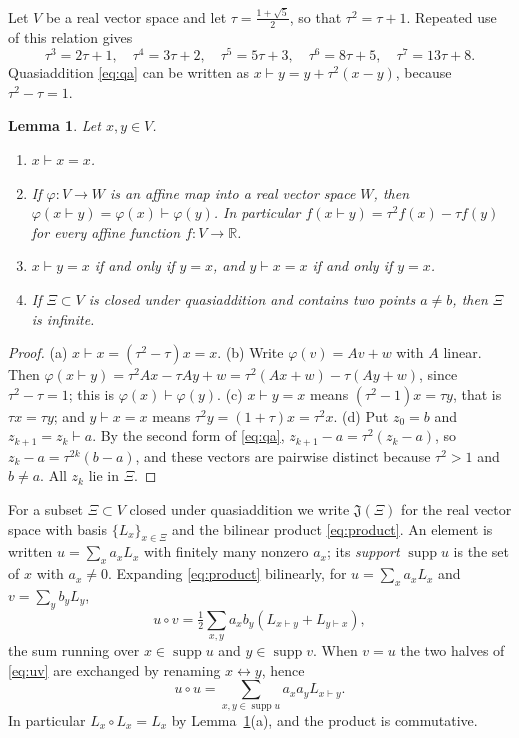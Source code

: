 \documentclass[11pt]{amsart}
\newtheorem{lemma}[theorem]{Lemma}
\theoremstyle{definition}
\theoremstyle{remark}
\newcommand{\R}{\mathbb{R}}
\newcommand{\J}{\mathfrak{J}}
\newcommand{\qa}{\vdash}
\newcommand{\supp}{\operatorname{supp}}
\begin{document}
Let $V$ be a real vector space and let $\tau=\frac{1+\sqrt5}{2}$, so that $\tau^2=\tau+1$. Repeated use of this relation gives
\begin{equation}\label{eq:powers}
\tau^3=2\tau+1,\quad \tau^4=3\tau+2,\quad \tau^5=5\tau+3,\quad \tau^6=8\tau+5,\quad \tau^7=13\tau+8 .
\end{equation}
Quasiaddition \eqref{eq:qa} can be written as $x\qa y=y+\tau^2(x-y)$, because $\tau^2-\tau=1$.

\begin{lemma}\label{lem:qa}
Let $x,y\in V$.
\begin{enumerate}
\item[(a)] $x\qa x=x$.
\item[(b)] If $\varphi\colon V\to W$ is an affine map into a real vector space $W$, then $\varphi(x\qa y)=\varphi(x)\qa\varphi(y)$. In particular $f(x\qa y)=\tau^2f(x)-\tau f(y)$ for every affine function $f\colon V\to\R$.
\item[(c)] $x\qa y=x$ if and only if $y=x$, and $y\qa x=x$ if and only if $y=x$.
\item[(d)] If $\Xi\subset V$ is closed under quasiaddition and contains two points $a\neq b$, then $\Xi$ is infinite.
\end{enumerate}
\end{lemma}

\begin{proof}
(a) $x\qa x=(\tau^2-\tau)x=x$. (b) Write $\varphi(v)=Av+w$ with $A$ linear. Then $\varphi(x\qa y)=\tau^2Ax-\tau Ay+w=\tau^2(Ax+w)-\tau(Ay+w)$, since $\tau^2-\tau=1$; this is $\varphi(x)\qa\varphi(y)$. (c) $x\qa y=x$ means $(\tau^2-1)x=\tau y$, that is $\tau x=\tau y$; and $y\qa x=x$ means $\tau^2y=(1+\tau)x=\tau^2x$. (d) Put $z_0=b$ and $z_{k+1}=z_k\qa a$. By the second form of \eqref{eq:qa}, $z_{k+1}-a=\tau^2(z_k-a)$, so $z_k-a=\tau^{2k}(b-a)$, and these vectors are pairwise distinct because $\tau^2>1$ and $b\ne a$. All $z_k$ lie in $\Xi$.
\end{proof}

For a subset $\Xi\subset V$ closed under quasiaddition we write $\J(\Xi)$ for the real vector space with basis $\{L_x\}_{x\in\Xi}$ and the bilinear product \eqref{eq:product}. An element is written $u=\sum_xa_xL_x$ with finitely many nonzero $a_x$; its \emph{support} $\supp u$ is the set of $x$ with $a_x\ne0$. Expanding \eqref{eq:product} bilinearly, for $u=\sum_xa_xL_x$ and $v=\sum_yb_yL_y$,
\begin{equation}\label{eq:uv}
u\circ v=\tfrac12\sum_{x,y}a_xb_y\left(L_{x\qa y}+L_{y\qa x}\right),
\end{equation}
the sum running over $x\in\supp u$ and $y\in\supp v$. When $v=u$ the two halves of \eqref{eq:uv} are exchanged by renaming $x\leftrightarrow y$, hence
\begin{equation}\label{eq:uu}
u\circ u=\sum_{x,y\in\supp u}a_xa_yL_{x\qa y}.
\end{equation}
In particular $L_x\circ L_x=L_x$ by Lemma~\ref{lem:qa}(a), and the product is commutative.
\end{document}
